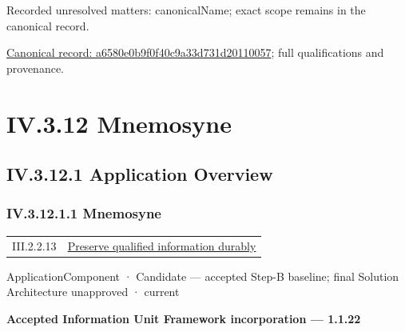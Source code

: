 {\small Recorded unresolved matters: canonicalName; exact scope remains in the canonical record.}\par
{\footnotesize \href{../../../../../../../../continuum/application/application-function/a6580e0b9f0f40c9a33d731d20110057.md}{Canonical record: a6580e0b9f0f40c9a33d731d20110057}; full qualifications and provenance.}\par
\section*{IV.3.12 Mnemosyne}
\label{navigation:IV.3.12}

\subsection*{IV.3.12.1 Application Overview}
\label{navigation:IV.3.12.1}

\subsubsection*{IV.3.12.1.1 Mnemosyne}
\label{navigation:IV.3.12.1.1}

\begin{longtable}{p{.22\linewidth}p{.73\linewidth}}
III.2.2.13 & \hyperref[element:e07ef0bcd9444af3a22ab45bbb3afc38]{Preserve qualified information durably} \\
\end{longtable}
\label{element:7985e647bf9e4ca3ba70faf9e3e4ae02}
{\small ApplicationComponent · Candidate — accepted Step-B baseline; final Solution Architecture unapproved · current}\par

\par\medskip\textbf{Accepted Information Unit Framework incorporation — 1.1.22}\par


